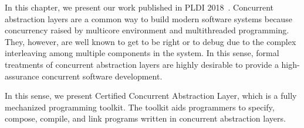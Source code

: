 
In this chapter, we present our work published in PLDI 2018~\cite{concurrency}.
Concurrent abstraction layers are a common way to 
build modern software systems 
because concurrency raised by multicore environment and multithreaded programming. 
They, however, are well known to get to be right or to debug due to 
the complex interleaving among multiple components in the system. 
In this sense, formal treatments of concurrent abstraction layers 
are highly desirable to provide a 
high-assurance concurrent software development. 

In this sense, we present Certified Concurrent Abstraction Layer, which is a fully mechanized programming toolkit.
The toolkit aids programmers to specify, compose, compile, and link programs written in
concurrent abstraction layers. 